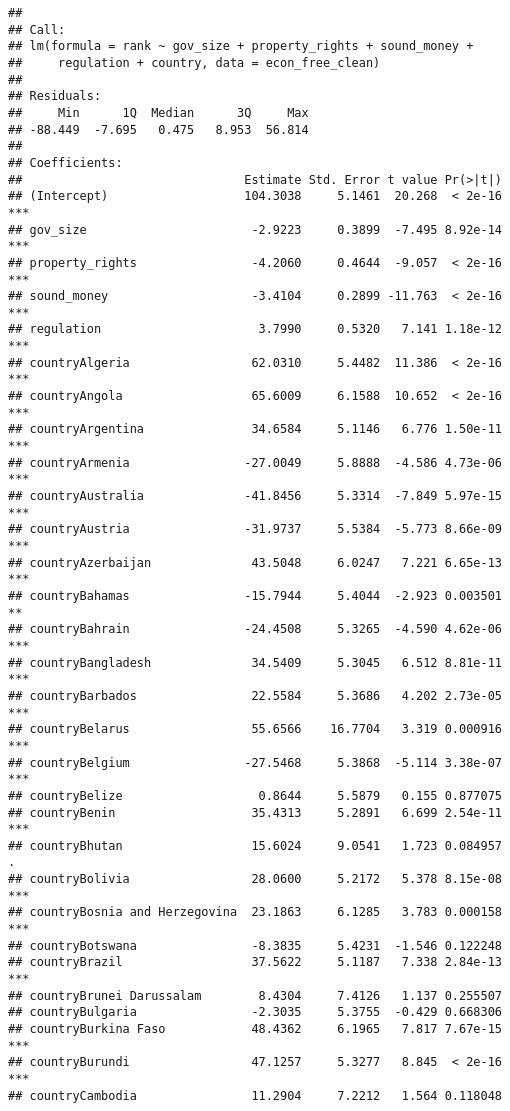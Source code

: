 \documentclass[
  11pt,
]{article}
\begin{document}
\begin{verbatim}
## 
## Call:
## lm(formula = rank ~ gov_size + property_rights + sound_money + 
##     regulation + country, data = econ_free_clean)
## 
## Residuals:
##     Min      1Q  Median      3Q     Max 
## -88.449  -7.695   0.475   8.953  56.814 
## 
## Coefficients:
##                               Estimate Std. Error t value Pr(>|t|)    
## (Intercept)                   104.3038     5.1461  20.268  < 2e-16 ***
## gov_size                       -2.9223     0.3899  -7.495 8.92e-14 ***
## property_rights                -4.2060     0.4644  -9.057  < 2e-16 ***
## sound_money                    -3.4104     0.2899 -11.763  < 2e-16 ***
## regulation                      3.7990     0.5320   7.141 1.18e-12 ***
## countryAlgeria                 62.0310     5.4482  11.386  < 2e-16 ***
## countryAngola                  65.6009     6.1588  10.652  < 2e-16 ***
## countryArgentina               34.6584     5.1146   6.776 1.50e-11 ***
## countryArmenia                -27.0049     5.8888  -4.586 4.73e-06 ***
## countryAustralia              -41.8456     5.3314  -7.849 5.97e-15 ***
## countryAustria                -31.9737     5.5384  -5.773 8.66e-09 ***
## countryAzerbaijan              43.5048     6.0247   7.221 6.65e-13 ***
## countryBahamas                -15.7944     5.4044  -2.923 0.003501 ** 
## countryBahrain                -24.4508     5.3265  -4.590 4.62e-06 ***
## countryBangladesh              34.5409     5.3045   6.512 8.81e-11 ***
## countryBarbados                22.5584     5.3686   4.202 2.73e-05 ***
## countryBelarus                 55.6566    16.7704   3.319 0.000916 ***
## countryBelgium                -27.5468     5.3868  -5.114 3.38e-07 ***
## countryBelize                   0.8644     5.5879   0.155 0.877075    
## countryBenin                   35.4313     5.2891   6.699 2.54e-11 ***
## countryBhutan                  15.6024     9.0541   1.723 0.084957 .  
## countryBolivia                 28.0600     5.2172   5.378 8.15e-08 ***
## countryBosnia and Herzegovina  23.1863     6.1285   3.783 0.000158 ***
## countryBotswana                -8.3835     5.4231  -1.546 0.122248    
## countryBrazil                  37.5622     5.1187   7.338 2.84e-13 ***
## countryBrunei Darussalam        8.4304     7.4126   1.137 0.255507    
## countryBulgaria                -2.3035     5.3755  -0.429 0.668306    
## countryBurkina Faso            48.4362     6.1965   7.817 7.67e-15 ***
## countryBurundi                 47.1257     5.3277   8.845  < 2e-16 ***
## countryCambodia                11.2904     7.2212   1.564 0.118048    

\end{verbatim}
\end{document}
